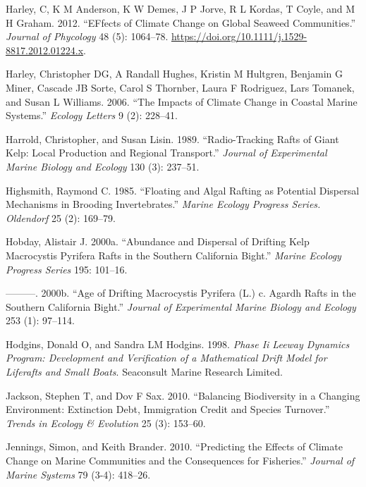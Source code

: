 \documentclass[
]{article}
\begin{document}
\leavevmode\hypertarget{ref-Harley2012}{}%
Harley, C, K M Anderson, K W Demes, J P Jorve, R L Kordas, T Coyle, and
M H Graham. 2012. ``EFfects of Climate Change on Global Seaweed
Communities.'' \emph{Journal of Phycology} 48 (5): 1064--78.
\url{https://doi.org/10.1111/j.1529-8817.2012.01224.x}.

\leavevmode\hypertarget{ref-Harley2006}{}%
Harley, Christopher DG, A Randall Hughes, Kristin M Hultgren, Benjamin G
Miner, Cascade JB Sorte, Carol S Thornber, Laura F Rodriguez, Lars
Tomanek, and Susan L Williams. 2006. ``The Impacts of Climate Change in
Coastal Marine Systems.'' \emph{Ecology Letters} 9 (2): 228--41.

\leavevmode\hypertarget{ref-harrold1989}{}%
Harrold, Christopher, and Susan Lisin. 1989. ``Radio-Tracking Rafts of
Giant Kelp: Local Production and Regional Transport.'' \emph{Journal of
Experimental Marine Biology and Ecology} 130 (3): 237--51.

\leavevmode\hypertarget{ref-highsmith1985}{}%
Highsmith, Raymond C. 1985. ``Floating and Algal Rafting as Potential
Dispersal Mechanisms in Brooding Invertebrates.'' \emph{Marine Ecology
Progress Series. Oldendorf} 25 (2): 169--79.

\leavevmode\hypertarget{ref-hobday2000a}{}%
Hobday, Alistair J. 2000a. ``Abundance and Dispersal of Drifting Kelp
Macrocystis Pyrifera Rafts in the Southern California Bight.''
\emph{Marine Ecology Progress Series} 195: 101--16.

\leavevmode\hypertarget{ref-hobday2000b}{}%
---------. 2000b. ``Age of Drifting Macrocystis Pyrifera (L.) c. Agardh
Rafts in the Southern California Bight.'' \emph{Journal of Experimental
Marine Biology and Ecology} 253 (1): 97--114.

\leavevmode\hypertarget{ref-hodgins1998}{}%
Hodgins, Donald O, and Sandra LM Hodgins. 1998. \emph{Phase Ii Leeway
Dynamics Program: Development and Verification of a Mathematical Drift
Model for Liferafts and Small Boats}. Seaconsult Marine Research
Limited.

\leavevmode\hypertarget{ref-jackson2010}{}%
Jackson, Stephen T, and Dov F Sax. 2010. ``Balancing Biodiversity in a
Changing Environment: Extinction Debt, Immigration Credit and Species
Turnover.'' \emph{Trends in Ecology \& Evolution} 25 (3): 153--60.

\leavevmode\hypertarget{ref-Jennings2010}{}%
Jennings, Simon, and Keith Brander. 2010. ``Predicting the Effects of
Climate Change on Marine Communities and the Consequences for
Fisheries.'' \emph{Journal of Marine Systems} 79 (3-4): 418--26.
\end{document}
